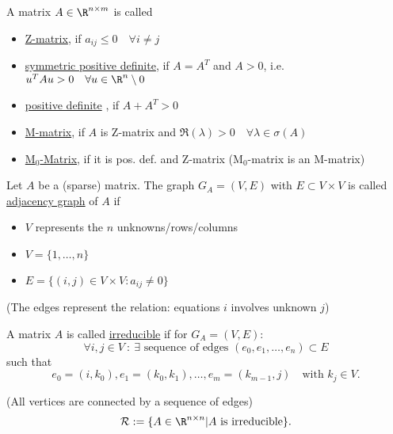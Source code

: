 \begin{definition}
\label{thm:typeOfMatrices}
	A matrix $A \in  \R^{n \times m}$ is called
	\begin{itemize}
		\item \underline{Z-matrix}, if $a_{ij}\leq 0\quad \forall i\neq j$
		\item \underline{symmetric positive definite}, if $A=A^{T}$ and $A>0$, i.e. $u^{T}Au>0\quad\forall u \in \R^{n} \setminus 0$
		\item \underline{positive definite} , if $A+A^{T}>0$
		\item \underline{M-matrix}, if $A$ is Z-matrix and $\Re(\lambda) > 0 \quad\forall \lambda \in \sigma (A)$
		\item \underline{M$_{0}$-Matrix}, if it is pos. def. and Z-matrix (M$_{0}$-matrix is an M-matrix)
	\end{itemize}
\end{definition}

\begin{definition}
\label{thm:adjacenyGraph}
Let $A$ be a (sparse) matrix. The graph $G_{A}=(V,E)$ with $E \subset V \times V$ is called \underline{adjacency graph} of $A$ if 
\begin{itemize}[label=]
	\item $V$ represents the $n$ unknowns/rows/columns
	\item $V=\{1, \ldots, n\}$
	\item $E=\{(i,j) \in  V \times V : a_{ij}\neq 0\}$
\end{itemize}
(The edges represent the relation: equations $i$ involves unknown $j$)
\end{definition}

\begin{definition}
\label{thm:}
A matrix $A$ is called \underline{irreducible} if for $G_{A}=(V,E)$:
\[
	\forall i,j \in V ~:~ \exists \text{ sequence of edges } (e_0, e_1, \ldots , e_{n}) \subset E
\] 
such that
\[
	e_0=(i, k_0), e_1=(k_0,k_1),\ldots , e_{m}=(k_{m-1},j) \quad \text{with } k_{j} \in V
.\] 

(All vertices are connected by a sequence of edges)
\[
	\mathcal{R}:= \{A \in  \R^{n \times  n} | A \text{ is irreducible}\}
.\] 

\end{definition}
